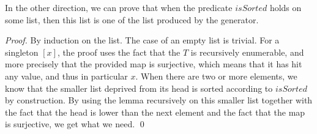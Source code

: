In the other direction, we can prove that when the predicate $isSorted$ holds on some list, then this list is one of the list produced by the generator. 
\begin{proof}
By induction on the list. The case of an empty list is trivial. For a singleton $[x]$, the proof uses the fact that the $T$ is recursively enumerable, and more precisely that the provided map is surjective, which means that it has hit any value, and thus in particular $x$. When there are two or more elements, we know that the smaller list deprived from its head is sorted according to $isSorted$ by construction. By using the lemma recursively on this smaller list together with the fact that the head is lower than the next element and the fact that the map is surjective, we get what we need. \qed
\end{proof}